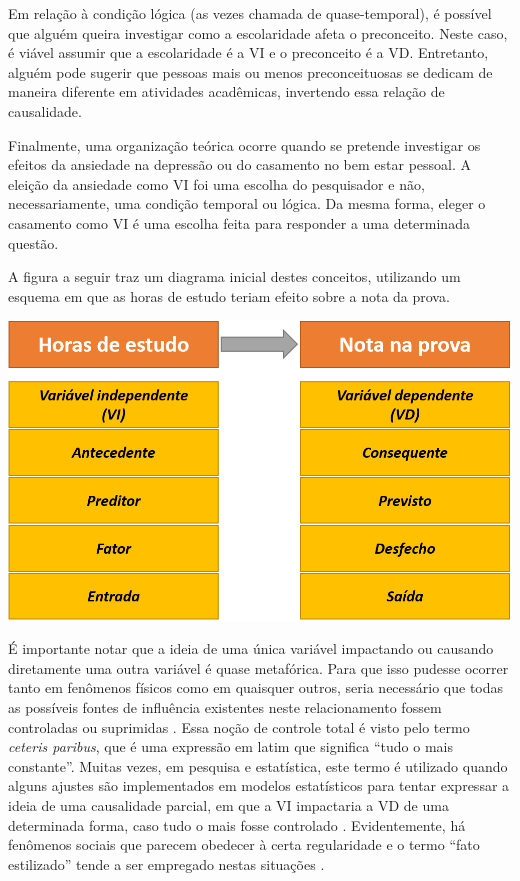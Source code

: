 \documentclass[
]{book}
\begin{document}
Em relação à condição lógica (as vezes chamada de quase-temporal), é possível que alguém queira investigar como a escolaridade afeta o preconceito. Neste caso, é viável assumir que a escolaridade é a VI e o preconceito é a VD. Entretanto, alguém pode sugerir que pessoas mais ou menos preconceituosas se dedicam de maneira diferente em atividades acadêmicas, invertendo essa relação de causalidade.

Finalmente, uma organização teórica ocorre quando se pretende investigar os efeitos da ansiedade na depressão ou do casamento no bem estar pessoal. A eleição da ansiedade como VI foi uma escolha do pesquisador e não, necessariamente, uma condição temporal ou lógica. Da mesma forma, eleger o casamento como VI é uma escolha feita para responder a uma determinada questão.

A figura a seguir traz um diagrama inicial destes conceitos, utilizando um esquema em que as horas de estudo teriam efeito sobre a nota da prova.

\includegraphics{./img/cap_vi_vd.png}

É importante notar que a ideia de uma única variável impactando ou causando diretamente uma outra variável é quase metafórica. Para que isso pudesse ocorrer tanto em fenômenos físicos como em quaisquer outros, seria necessário que todas as possíveis fontes de influência existentes neste relacionamento fossem controladas ou suprimidas \citep{Dumsday2012}. Essa noção de controle total é visto pelo termo \emph{ceteris paribus}, que é uma expressão em latim que significa ``tudo o mais constante''. Muitas vezes, em pesquisa e estatística, este termo é utilizado quando alguns ajustes são implementados em modelos estatísticos para tentar expressar a ideia de uma causalidade parcial, em que a VI impactaria a VD de uma determinada forma, caso tudo o mais fosse controlado \citep{Fennell2005}. Evidentemente, há fenômenos sociais que parecem obedecer à certa regularidade e o termo ``fato estilizado'' tende a ser empregado nestas situações \citep{Hirschman2016}.
\end{document}
